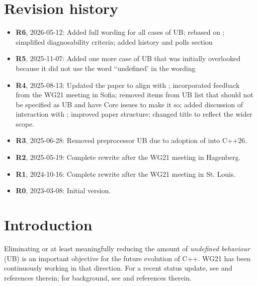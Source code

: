 
\pagebreak
\tableofcontents*
\pagebreak



\section*{Revision history}
\begin{itemize}
\item \textbf{R6}, 2026-05-12: Added full wording for all cases of UB; rebased on \cite{P3596R1}; simplified diagnosability criteria; added history and polls section
\item \textbf{R5}, 2025-11-07: Added one more case of UB that was initially overlooked because it did not use the word ``undefined' in the wording
\item \textbf{R4}, 2025-08-13: Updated the paper to align with \cite{P3754R0}; incorporated feedback from the WG21 meeting in Sofia; removed items from UB list that should not be specified as UB and have Core issues to make it so; added discussion of interaction with ; improved paper structure; changed title to reflect the wider scope.
\item \textbf{R3}, 2025-06-28: Removed preprocessor UB due to adoption of \cite{P2843R3} into C++26.
\item \textbf{R2}, 2025-05-19: Complete rewrite after the WG21 meeting in Hagenberg.
\item \textbf{R1}, 2024-10-16: Complete rewrite after the WG21 meeting in St. Louis.
\item \textbf{R0}, 2023-03-08: Initial version.
\end{itemize}

\pagebreak


\section{Introduction}
\label{intro}

Eliminating or at least meaningfully reducing the amount of \emph{undefined behaviour} (UB) is an important objective for the future evolution of C++. WG21 has been continuously working in that direction. For a recent status update, see \cite{Sutter2025} and references therein; for background, see \cite{Sutter2024} and references therein.

